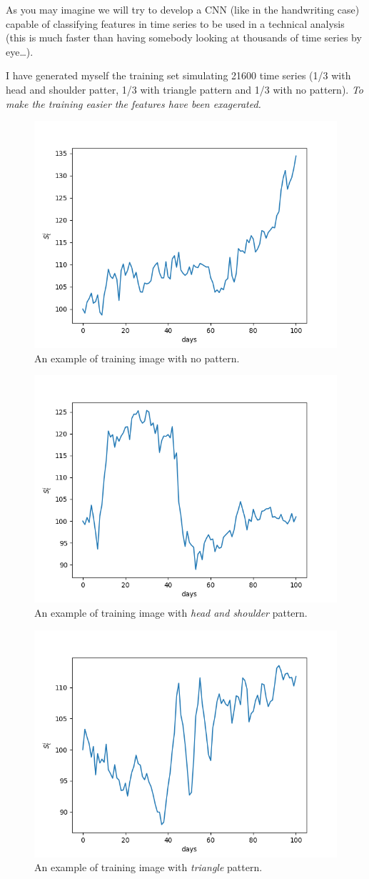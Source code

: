 As you may imagine we will try to develop a CNN (like in the handwriting
case) capable of classifying features in time series to be used in a
technical analysis (this is much faster than having somebody looking at
thousands of time series by eye\ldots{}).

I have generated myself the training set simulating 21600 time series
(1/3 with head and shoulder patter, 1/3 with triangle pattern and 1/3
with no pattern). \emph{To make the training easier the features have
been exagerated.}

\begin{figure}
  \centering
  \includegraphics[width=0.6\linewidth]{figures/image_1.png}
  \caption{An example of training image with no pattern.}
\end{figure}

\begin{figure}
  \centering
  \includegraphics[width=0.6\linewidth]{figures/image_2.png}
  \caption{An example of training image with \emph{head and shoulder} pattern.}
\end{figure}

\begin{figure}
  \centering
  \includegraphics[width=0.6\linewidth]{figures/image_0.png}
  \caption{An example of training image with \emph{triangle} pattern.}
\end{figure}

